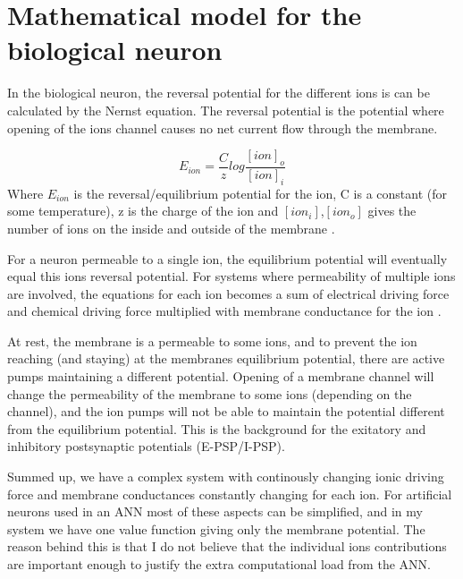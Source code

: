 
% 
% 
%

\section{Mathematical model for the biological neuron}
\label{secMatematiskModelleringAvBioNeuron}
In the biological neuron, the reversal potential for the different ions is can be calculated by the Nernst equation. 
The reversal potential is the potential where opening of the ions channel causes no net current flow through the membrane.

\begin{equation}
 	E_{ion} = \frac{C}{z} log\frac{[ion]_o}{[ion]_i}
\end{equation}
Where $E_{ion}$ is the reversal/equilibrium potential for the ion, C is a constant (for some temperature), z is the charge of the ion and $[ion_i]$,$[ion_o]$ gives the number of ions on the inside and outside of the membrane
\cite{NeuroscienceExploringTheBrain3edKAP3}.

For a neuron permeable to a single ion, the equilibrium potential will eventually equal this ions reversal potential. %
For systems where permeability of multiple ions are involved, the equations for each ion becomes a sum of electrical driving force and chemical driving force multiplied with membrane conductance for the ion
\cite{PrinciplesOfNeuralScience4edKAP07}.

At rest, the membrane is a permeable to some ions, and to prevent the ion reaching (and staying) at the membranes equilibrium potential, there are active pumps maintaining a different potential. 
Opening of a membrane channel will change the permeability of the membrane to some ions (depending on the channel), and the ion pumps will not be able to maintain the potential different from the equilibrium potential. 
This is the background for the exitatory and inhibitory postsynaptic potentials (E-PSP/I-PSP)\cite{PrinciplesOfNeuralScience4edKAP07}.

Summed up, we have a complex system with continously changing ionic driving force and membrane conductances constantly changing for each ion. 
For artificial neurons used in an ANN most of these aspects can be simplified, and in my system we have one value function giving only the membrane potential. 
The reason behind this is that I do not believe that the individual ions contributions are important enough to justify the extra computational load from the ANN. 




